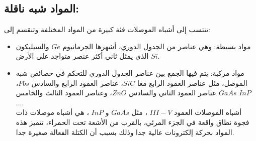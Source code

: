 \subsection{المواد شبه ناقلة:}
تنتسب إلى أشباه الموصلات فئة كبيرة من المواد المختلفة وتنقسم إلى:
\begin{itemize}
	\item مواد بسيطة: وهي عناصر من الجدول الدوري، أشهرها الجرمانيوم $ Ge $ والسيليكون $ Si $ الذي يمثل ثاني أكثر عنصر متواجد على الأرض.
	\item مواد مركبة: يتم فيها الجمع بين عناصر الجدول الدوري للتحكم في خصائص شبه الموصل، مثل عناصر العمود الرابع معا $ SiC $، عناصر العمود الرابع والسادس $ Pbs $، عناصر العمود الثاني والسادس $ ZnO $، وعناصر العمود الثالث والخامس $ GaAs $ $ InP $....
	\\
	أشباه الموصلات العمود $ III-V $ ، مثل $ GaAs $ و $ InP $ ، هي أشباه موصلات ذات فجوة نطاق واقعة في الجزء المرئي، بالقرب من الأشعة تحت الحمراء، تتميز هذه المواد بحركة إلكترونات عالية جدا وذلك بسبب أن الكتلة الفعالة صغيرة جدا.
	
\end{itemize}
